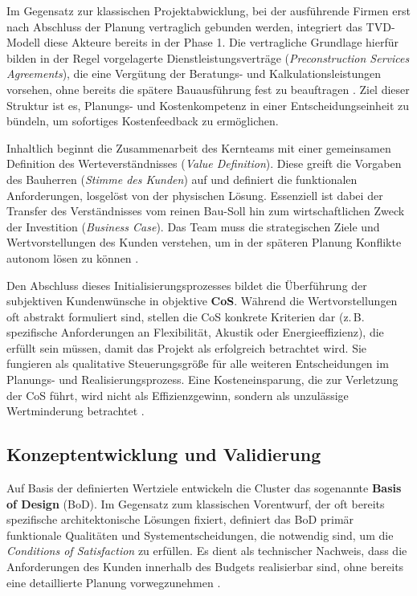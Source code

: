 Im Gegensatz zur klassischen Projektabwicklung, bei der ausführende Firmen erst nach Abschluss der Planung vertraglich gebunden werden, integriert das \acs{TVD}-Modell diese Akteure bereits in der Phase 1. Die vertragliche Grundlage hierfür bilden in der Regel vorgelagerte Dienstleistungsverträge (\textit{Preconstruction Services Agreements}), die eine Vergütung der Beratungs- und Kalkulationsleistungen vorsehen, ohne bereits die spätere Bauausführung fest zu beauftragen \autocite[Vgl.][S.~152 f]{ballard_target_2025}. Ziel dieser Struktur ist es, Planungs- und Kostenkompetenz in einer Entscheidungseinheit zu bündeln, um sofortiges Kostenfeedback zu ermöglichen.

Inhaltlich beginnt die Zusammenarbeit des Kernteams mit einer gemeinsamen Definition des Werteverständnisses (\textit{Value Definition}). Diese greift die Vorgaben des Bauherren (\textit{Stimme des Kunden}) auf und definiert die funktionalen Anforderungen, losgelöst von der physischen Lösung. Essenziell ist dabei der Transfer des Verständnisses vom reinen Bau-Soll hin zum wirtschaftlichen Zweck der Investition (\textit{Business Case}). Das Team muss die strategischen Ziele und Wertvorstellungen des Kunden verstehen, um in der späteren Planung Konflikte autonom lösen zu können \autocite[Vgl.][S.~13]{ballard_target_2025}.

Den Abschluss dieses Initialisierungsprozesses bildet die Überführung der subjektiven Kundenwünsche in objektive \textbf{\ac{CoS}}. Während die Wertvorstellungen oft abstrakt formuliert sind, stellen die \acs{CoS} konkrete Kriterien dar (z.\,B. spezifische Anforderungen an Flexibilität, Akustik oder Energieeffizienz), die erfüllt sein müssen, damit das Projekt als erfolgreich betrachtet wird. Sie fungieren als qualitative Steuerungsgröße für alle weiteren Entscheidungen im Planungs- und Realisierungsprozess. Eine Kosteneinsparung, die zur Verletzung der \ac{CoS} führt, wird nicht als Effizienzgewinn, sondern als unzulässige Wertminderung betrachtet \autocite[Vgl.][S.~120]{ballard_target_2025}.

\subsection{Konzeptentwicklung und Validierung}
\label{sec:4.3.2}

Auf Basis der definierten Wertziele entwickeln die Cluster das sogenannte \textbf{Basis of Design} (BoD). Im Gegensatz zum klassischen Vorentwurf, der oft bereits spezifische architektonische Lösungen fixiert, definiert das BoD primär funktionale Qualitäten und Systementscheidungen, die notwendig sind, um die \textit{Conditions of Satisfaction} zu erfüllen. Es dient als technischer Nachweis, dass die Anforderungen des Kunden innerhalb des Budgets realisierbar sind, ohne bereits eine detaillierte Planung vorwegzunehmen \autocite[Vgl.][S.~25 f]{hill_target_2017}.

